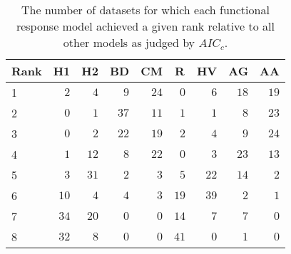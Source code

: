 \begin{table}[!tbp]
\caption{The number of datasets for which each functional response model achieved a given rank relative to all other models as judged by $AIC_c$.\label{table:AICc_rankings}} 
\begin{center}
\begin{tabular}{lrrrrrrrr}
\hline\hline
\multicolumn{1}{l}{Rank}&\multicolumn{1}{c}{H1}&\multicolumn{1}{c}{H2}&\multicolumn{1}{c}{BD}&\multicolumn{1}{c}{CM}&\multicolumn{1}{c}{R}&\multicolumn{1}{c}{HV}&\multicolumn{1}{c}{AG}&\multicolumn{1}{c}{AA}\tabularnewline
\hline
1&$ 2$&$ 4$&$ 9$&$24$&$ 0$&$ 6$&$18$&$19$\tabularnewline
2&$ 0$&$ 1$&$37$&$11$&$ 1$&$ 1$&$ 8$&$23$\tabularnewline
3&$ 0$&$ 2$&$22$&$19$&$ 2$&$ 4$&$ 9$&$24$\tabularnewline
4&$ 1$&$12$&$ 8$&$22$&$ 0$&$ 3$&$23$&$13$\tabularnewline
5&$ 3$&$31$&$ 2$&$ 3$&$ 5$&$22$&$14$&$ 2$\tabularnewline
6&$10$&$ 4$&$ 4$&$ 3$&$19$&$39$&$ 2$&$ 1$\tabularnewline
7&$34$&$20$&$ 0$&$ 0$&$14$&$ 7$&$ 7$&$ 0$\tabularnewline
8&$32$&$ 8$&$ 0$&$ 0$&$41$&$ 0$&$ 1$&$ 0$\tabularnewline
\hline
\end{tabular}\end{center}
\end{table}

